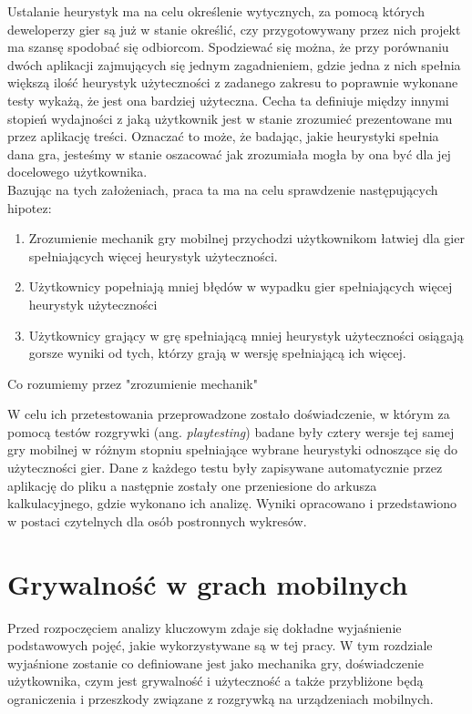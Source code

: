 \documentclass[a4paper,12pt,numbers=noenddot]{report}
\begin{document}
Ustalanie heurystyk ma na celu określenie wytycznych, za pomocą których deweloperzy gier są już w stanie określić, czy przygotowywany przez nich projekt ma szansę spodobać się odbiorcom. Spodziewać się można, że przy porównaniu dwóch aplikacji zajmujących się jednym zagadnieniem, gdzie jedna z nich spełnia większą ilość heurystyk użyteczności z zadanego zakresu to poprawnie wykonane testy wykażą, że jest ona bardziej użyteczna. Cecha ta definiuje między innymi stopień wydajności z jaką użytkownik jest w stanie zrozumieć prezentowane mu przez aplikację treści. Oznaczać to może, że badając, jakie heurystyki spełnia dana gra, jesteśmy w stanie oszacować jak zrozumiała mogła by ona być dla jej docelowego użytkownika.\\
Bazując na tych założeniach, praca ta ma na celu sprawdzenie następujących hipotez:

\begin{enumerate}
\item Zrozumienie mechanik gry mobilnej przychodzi użytkownikom łatwiej dla gier spełniających więcej heurystyk użyteczności.
\item Użytkownicy popełniają mniej błędów w wypadku gier spełniających więcej heurystyk użyteczności
\item Użytkownicy grający w grę spełniającą mniej heurystyk użyteczności osiągają gorsze wyniki od tych, którzy grają w wersję spełniającą ich więcej.
\end{enumerate}

Co rozumiemy przez "zrozumienie mechanik"

W celu ich przetestowania przeprowadzone zostało doświadczenie, w którym za pomocą testów rozgrywki (ang. \textit{playtesting}) badane były cztery wersje tej samej gry mobilnej w różnym stopniu spełniające wybrane heurystyki odnoszące się do użyteczności gier. Dane z każdego testu były zapisywane automatycznie przez aplikację do pliku a następnie zostały one przeniesione do arkusza kalkulacyjnego, gdzie wykonano ich analizę. Wyniki opracowano i przedstawiono w postaci czytelnych dla osób postronnych wykresów.


\chapter{Grywalność w grach mobilnych}
Przed rozpoczęciem analizy kluczowym zdaje się dokładne wyjaśnienie podstawowych pojęć, jakie wykorzystywane są w tej pracy. W tym rozdziale wyjaśnione zostanie co definiowane jest jako mechanika gry, doświadczenie użytkownika, czym jest grywalność i użyteczność a także przybliżone będą ograniczenia i przeszkody związane z rozgrywką na urządzeniach mobilnych.
\end{document}
